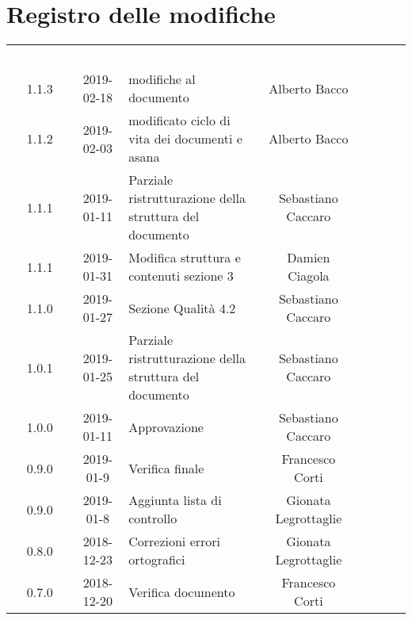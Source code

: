 
\section*{Registro delle modifiche}
{
	\renewcommand{\arraystretch}{1.5}
	\centering
	\begin{longtable}{ c c C{4cm}  c  c }
		
		\textcolor{white}{\textbf{Versione}} & \textcolor{white}{\textbf{Data}} & \textcolor{white}{\textbf{Descrizione}} & \textcolor{white}{\textbf{Nominativo}} & \textcolor{white}{\textbf{Ruolo}}\\
		1.1.3 & 2019-02-18 & modifiche al documento & Alberto Bacco & \reda{} \\
		
		1.1.2 & 2019-02-03 & modificato ciclo di vita dei documenti e asana & Alberto Bacco& \reda{} \\
		
		1.1.1 & 2019-01-11 & Parziale ristrutturazione della struttura del documento & Sebastiano Caccaro & \reda{} \\		
		
		1.1.1 & 2019-01-31 & Modifica struttura e contenuti sezione 3  & Damien Ciagola & \reda{} \\	
		
		1.1.0 & 2019-01-27 & Sezione Qualità 4.2 & Sebastiano Caccaro & \reda{} \\	
		
		1.0.1 & 2019-01-25 & Parziale ristrutturazione della struttura del documento & Sebastiano Caccaro & \reda{} \\		
		
		1.0.0 & 2019-01-11 & Approvazione & Sebastiano Caccaro & \Res{} \\
		
		0.9.0 & 2019-01-9 & Verifica finale & Francesco Corti & \ver{} \\
		
		0.9.0 & 2019-01-8 & Aggiunta lista di controllo & Gionata Legrottaglie & \reda{} \\
		
		0.8.0 & 2018-12-23 & Correzioni errori ortografici & Gionata Legrottaglie & \reda{} \\
		
		0.7.0 & 2018-12-20 & Verifica documento & Francesco Corti & \ver{}\\
		

\end{longtable}}
